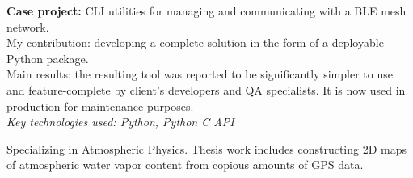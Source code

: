 \documentclass[
	a4paper,
]{fortysecondscv}
\begin{document}
\begin{cvtable}[3]
{	    \textbf{Case project:} CLI utilities for managing and communicating with a BLE mesh network.
	    \\
	    My contribution: developing a complete solution in the form of a deployable Python package.
	    \\
	    Main results: the resulting tool was reported to be significantly simpler to use and feature-complete by client's developers and QA specialists. It is now used in production for maintenance purposes.
	    \\
    	\textit{Key technologies used: Python, Python C API}
	}
\end{cvtable}


\begin{cvtable}[1.5]
		{Specializing in Atmospheric Physics. Thesis work includes constructing 2D maps of atmospheric water vapor content from copious amounts of GPS data.}
\end{cvtable}


\begin{cvtable}
\end{cvtable}


\end{document}
